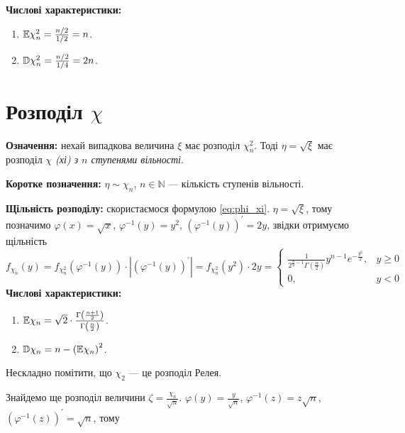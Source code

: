 \noindent\textbf{Числові характеристики:}
\begin{enumerate}
    \item $\mathbb{E}\chi_n^2 = \frac{n/2}{1/2} = n$.
    \item $\mathbb{D}\chi_n^2 = \frac{n/2}{1/4} = 2n$.
\end{enumerate}

\section{Розподіл \texorpdfstring{$\chi$}{x}}
\noindent\textbf{Означення:} нехай випадкова величина $\xi$ має розподіл $\chi_n^2$.
Тоді $\eta = \sqrt{\xi}$ має розподіл
\emph{$\chi$ (хі) з $n$ ступенями вільності}.

\noindent\textbf{Коротке позначення:} $\eta \sim \chi_n$, $n\in\mathbb{N}$ --- кількість ступенів вільності.

\noindent\textbf{Щільність розподілу:} скористаємося формулою \eqref{eq:phi_xi}. $\eta = \sqrt{\xi}$, тому позначимо $\varphi(x) = \sqrt{x}$, $\varphi^{-1}(y) = y^2$,
$\left( \varphi^{-1}(y) \right)^{\prime} = 2y$, звідки отримуємо щільність
\begin{equation*}
    f_{\chi_n}(y) = f_{\chi_n^2}\left(\varphi^{-1} (y)\right) \cdot \left|\left(\varphi^{-1} (y) \right)^{\prime}\right| =
f_{\chi_n^2}(y^2) \cdot 2y = 
\begin{cases}
    \frac{1}{2^{\frac{n}{2} - 1} \Gamma\left(\frac{n}{2}\right)} y^{n-1} e^{-\frac{y^2}{2}}, & y \geq 0 \\
    0, & y < 0
\end{cases}
\end{equation*}
\noindent\textbf{Числові характеристики:}
\begin{enumerate}
    \item $\mathbb{E}\chi_n = \sqrt{2} \cdot \frac{\Gamma\left(\frac{n+1}{2}\right)}{\Gamma\left(\frac{n}{2}\right)}$.
    \item $\mathbb{D}\chi_n = n - \left( \mathbb{E}\chi_n \right)^2$.
\end{enumerate}

\begin{remark}
    Нескладно помітити, що $\chi_2$ --- це розподіл Релея.
\end{remark} 

\noindent Знайдемо ще розподіл величини $\zeta = \frac{\chi_n}{\sqrt{n}}$. $\varphi(y) = \frac{y}{\sqrt{n}}$,
$\varphi^{-1}(z) = z \sqrt{n}$, 
$\left( \varphi^{-1}(z) \right)^{\prime} = \sqrt{n}$, тому

